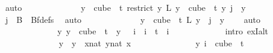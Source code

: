 \begin{isabellebody}
\ auto\isanewline
\ \ \ \ \ \ \ \ \ \ \isamarkupfalse%
\ \isamarkupfalse%
\ {\isachardoublequoteopen}{\isasymforall}y\ {\isasymin}\ cube\ {}\ t{\isachardot}{\kern0pt}\ {\isacharparenleft}{\kern0pt}{\isacharparenleft}{\kern0pt}restrict\ {\isacharparenleft}{\kern0pt}{\isasymlambda}y{\isachardot}{\kern0pt}\ L\ {\isacharparenleft}{\kern0pt}y\ {}{\isacharparenright}{\kern0pt}{\isacharparenright}{\kern0pt}\ {\isacharparenleft}{\kern0pt}cube\ {}\ t{\isacharparenright}{\kern0pt}{\isacharparenright}{\kern0pt}\ y{\isacharparenright}{\kern0pt}\ j\ {\isacharequal}{\kern0pt}\ y\ {}{\isachardoublequoteclose}\ \isamarkupfalse%
\ {\isacartoucheopen}j\ {\isasymin}\ B\ {}{\isacartoucheclose}\ Bf{\isacharunderscore}{\kern0pt}defs\ \isamarkupfalse%
\ auto\isanewline
\ \ \ \ \ \ \ \ \ \ \isamarkupfalse%
\ \isamarkupfalse%
\ {\isachardoublequoteopen}{\isasymforall}y\ {\isasymin}\ cube\ {}\ t{\isachardot}{\kern0pt}\ L\ {\isacharparenleft}{\kern0pt}y\ {}{\isacharparenright}{\kern0pt}\ j\ {\isacharequal}{\kern0pt}\ y\ {}{\isachardoublequoteclose}\ \ \isamarkupfalse%
\ auto\isanewline
\ \ \ \ \ \ \ \ \ \ \isamarkupfalse%
\ \isamarkupfalse%
\ {\isachardoublequoteopen}{\isasymexists}{\isacharbang}{\kern0pt}y{\isachardot}{\kern0pt}\ y\ {\isasymin}\ cube\ {}\ t\ {\isasymand}\ y\ {}\ {\isacharequal}{\kern0pt}\ i{\isachardoublequoteclose}\ \ {\isachardoublequoteopen}i\ {\isacharless}{\kern0pt}\ t{\isachardoublequoteclose}\ \ i\ \isanewline
\ \ \ \ \ \ \ \ \ \ \isamarkupfalse%
\ {\isacharparenleft}{\kern0pt}intro\ ex{}I{\isacharunderscore}{\kern0pt}alt{\isacharparenright}{\kern0pt}\isanewline
\ \ \ \ \ \ \ \ \ \ \ \ \isamarkupfalse%
\ y\ \ {\isachardoublequoteopen}y\ {\isasymequiv}\ {\isacharparenleft}{\kern0pt}{\isasymlambda}x{\isacharcolon}{\kern0pt}{\isacharcolon}{\kern0pt}nat{\isachardot}{\kern0pt}\ {\isasymlambda}y{\isasymin}{\isacharbraceleft}{\kern0pt}{\isachardot}{\kern0pt}{\isachardot}{\kern0pt}{\isacharless}{\kern0pt}{}{\isacharcolon}{\kern0pt}{\isacharcolon}{\kern0pt}nat{\isacharbraceright}{\kern0pt}{\isachardot}{\kern0pt}\ x{\isacharparenright}{\kern0pt}{\isachardoublequoteclose}\ \isanewline
\ \ \ \ \ \ \ \ \ \ \ \ \isamarkupfalse%
\ {\isachardoublequoteopen}y\ i\ {\isasymin}\ {\isacharparenleft}{\kern0pt}cube\ {}\ t{\isacharparenright}{\kern0pt}{\isachardoublequoteclose}\ \isamarkupfalse%

\end{isabellebody}
